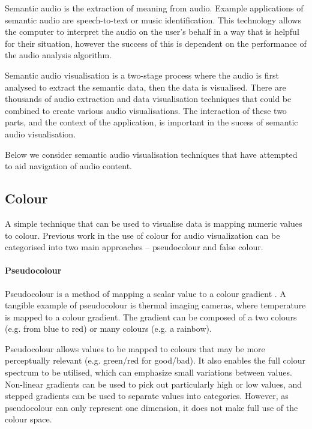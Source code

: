 Semantic audio is the extraction of meaning from audio. Example applications of semantic audio are speech-to-text or
music identification. This technology allows the computer to interpret the audio on the user's behalf in a way that is
helpful for their situation, however the success of this is dependent on the performance of the audio analysis
algorithm.

Semantic audio visualisation is a two-stage process where the audio is first analysed to extract the semantic data,
then the data is visualised. There are thousands of audio extraction and data visualisation techniques that could
be combined to create various audio visualisations. The interaction of these two parts, and the context of the
application, is important in the sucess of semantic audio visualisation. 

Below we consider semantic audio visualisation techniques that have attempted to aid navigation of audio content.



\subsection{Colour}\label{sec:colour}
A simple technique that can be used to visualise data is mapping numeric values to colour.  Previous work in the use of
colour for audio visualization can be categorised into two main approaches -- pseudocolour and false colour.

\paragraph{Pseudocolour}\label{sec:pseudocolour}
Pseudocolour is a method of mapping a scalar value to a colour gradient \citep{Moreland2009}.  A tangible example of
pseudocolour is thermal imaging cameras, where temperature is mapped to a colour gradient.  The gradient can be
composed of a two colours (e.g. from blue to red) or many colours (e.g. a rainbow).

Pseudocolour allows values to be mapped to colours that may be more perceptually relevant (e.g. green/red for
good/bad).  It also enables the full colour spectrum to be utilised, which can emphasize small variations between
values.  Non-linear gradients can be used to pick out particularly high or low values, and stepped gradients can be
used to separate values into categories.  However, as pseudocolour can only represent one dimension, it does not make
full use of the colour space.

